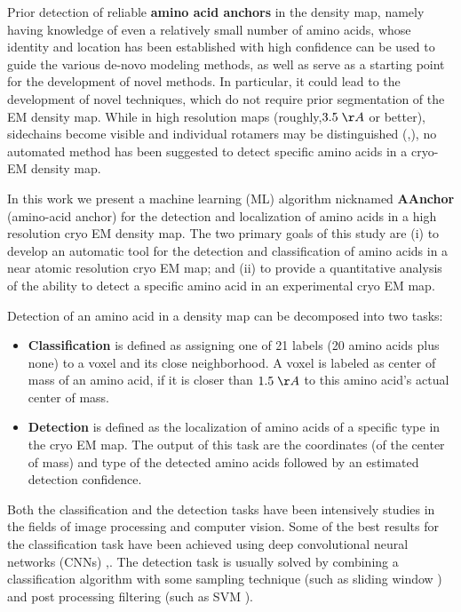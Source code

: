 Prior detection of reliable {\bf amino acid anchors} in the density map, namely having knowledge of even a relatively small number of amino acids, whose identity and location has been established with high confidence 
can be used to guide the various de-novo modeling methods, as well as serve as a starting point for the development of novel methods. In particular, it could lead to the development of novel techniques, which do not require prior segmentation of the EM density map.   While in high resolution maps (roughly,$3.5 \;\AA$ or better), sidechains become  visible and individual rotamers may be distinguished (\cite{DiMaio2016},\cite{Cassidy2018}), no automated method has been suggested to detect specific amino acids in a cryo-EM density map.

In this work we present a machine learning (ML) algorithm nicknamed {\bf AAnchor} (amino-acid anchor) for the detection and localization of amino acids in a high resolution cryo EM density map. 
The two primary goals of this study are 
(i) to develop an automatic tool for the detection and classification of amino acids in a near atomic resolution cryo EM map; and 
(ii) to provide a quantitative analysis of the ability to detect a specific amino acid in an experimental cryo EM map.

Detection of an amino acid in a density map can be decomposed into two tasks: 
\begin{itemize}
\item
\textbf{Classification} is defined as assigning  one of 21 labels (20 amino acids plus none) to a voxel and its close neighborhood. A voxel is labeled as center of mass of an amino acid, if it is closer than $1.5 \;\AA$ to this amino acid's actual center of mass.
\item
\textbf{Detection} is defined as the localization of amino acids of a specific type in the cryo EM map.
The output of this task are the coordinates (of the center of mass) and type of the detected amino acids followed by an estimated detection confidence.
\end{itemize}
Both the classification and the detection tasks have been intensively studies in the fields of image processing and computer vision.
Some of the best results for the classification task have been achieved using deep convolutional neural networks (CNNs)  \cite{Krizhevsky},\cite{Taigman}.
The detection task is usually solved by combining a classification algorithm with some sampling technique (such as sliding window )	and post processing filtering (such as SVM \cite{Girshick2014}).

